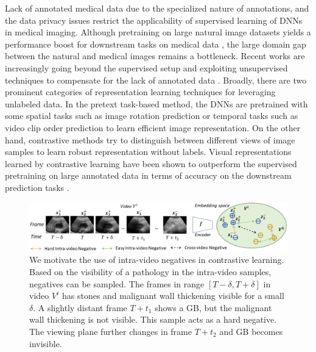 Lack of annotated medical data due to the specialized nature of annotations, and the data privacy issues restrict the applicability of supervised learning of DNNs in medical imaging. Although pretraining on large natural image datasets yields a performance boost for downstream tasks on medical data \cite{alzubaidi2020transferlearning,cheng2017transfer}, the large domain gap between the natural and medical images remains a bottleneck. Recent works are increasingly going beyond the supervised setup and exploiting unsupervised techniques to compensate for the lack of annotated data \cite{simclr,moco}. Broadly, there are two prominent categories of representation learning techniques for leveraging unlabeled data. In the pretext task-based method, the DNNs are pretrained with some spatial tasks such as image rotation prediction \cite{komodakis2018unsupervised} or temporal tasks such as video clip order prediction \cite{xu2019self} to learn efficient image representation. On the other hand, contrastive methods \cite{simclr} try to distinguish between different views of image samples to learn robust representation without labels. Visual representations learned by contrastive learning have been shown to outperform the supervised pretraining on large annotated data in terms of accuracy on the downstream prediction tasks \cite{simclr,moco}.  

\begin{figure}[t]
    \centering
    \includegraphics[width=\linewidth]{figs/usucl/teaser.png}
    \caption[Motivation of using intra-video negatives]{We motivate the use of intra-video negatives in contrastive learning. Based on the visibility of a pathology in the intra-video samples, negatives can be sampled. The frames in range $[T-\delta, T+\delta]$ in video $V^i$ has stones and malignant wall thickening visible for a small $\delta$. A slightly distant frame $T+t_1$ shows a GB, but the malignant wall thickening is not visible. This sample acts as a hard negative. The viewing plane further changes in frame $T+t_2$ and GB becomes invisible.}
    \label{usucl_fig:teaser}
\end{figure}

